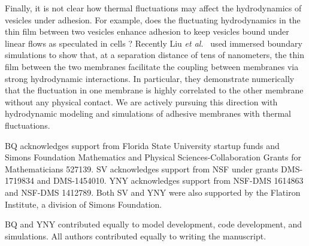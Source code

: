 \documentclass[prf,superscriptaddress,showkeys]{revtex4-1}
\begin{document}
Finally, it is not clear how thermal fluctuations may affect the
hydrodynamics of vesicles under adhesion. For example, does the
fluctuating hydrodynamics in the thin film between two vesicles enhance
adhesion to keep vesicles bound under linear flows as speculated in cells \cite{FenzBihrSchmidt2017_NaturePhys}?  Recently Liu {\em
et al.}~\cite{LiuChuNewbyRead2018_bioRxiv} used immersed boundary
simulations to show that, at a separation distance of tens of
nanometers, the thin film between the two membranes facilitate the
coupling between membranes via strong hydrodynamic interactions. In
particular, they demonstrate numerically that the fluctuation in one
membrane is highly correlated to the other membrane without any physical
contact. We are actively pursuing this direction with hydrodynamic
modeling and simulations of adhesive membranes with thermal fluctuations.

\acknowledgments

BQ acknowledges support from Florida State University startup funds and
Simons Foundation Mathematics and Physical Sciences-Collaboration Grants
for Mathematicians 527139.  SV acknowledges support from NSF under
grants DMS-1719834 and DMS-1454010.  YNY acknowledges support from
NSF-DMS 1614863 and NSF-DMS 1412789.  Both SV and YNY were also supported
by the Flatiron Institute, a division of Simons Foundation.

BQ and YNY contributed equally to model development, code development,
and simulations.  All authors contributed equally to writing the
manuscript.
\end{document}

